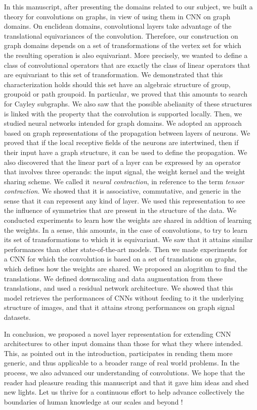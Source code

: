 In this manuscript, after presenting the domains related to our subject, we built a theory for convolutions on graphs, in view of using them in CNN on graph domains. On enclidean domains, convolutional layers take advantage of the translational equivariances of the convolution. Therefore, our construction on graph domains depends on a set of transformations of the vertex set for which the resulting operation is also equivariant. More precisely, we wanted to define a class of convolutional operators that are exactly the class of linear operators that are equivariant to this set of transformation. We demonstrated that this characterization holds should this set have an algebraic structure of group, groupoid or path groupoid. In particular, we proved that this amounts to search for Cayley subgraphs. We also saw that the possible abelianity of these structures is linked with the property that the convolution is supported locally. Then, we studied neural networks intended for graph domains. We adopted an approach based on graph representations of the propagation between layers of neurons. We proved that if the local receptive fields of the neurons are intertwined, then if their input have a graph structure, it can be used to define the propagation. We also discovered that the linear part of a layer can be expressed by an operator that involves three operands: the input signal, the weight kernel and the weight sharing scheme. We called it \emph{neural contraction}, in reference to the term \emph{tensor contraction}. We showed that it is associative, commutative, and generic in the sense that it can represent any kind of layer. We used this representation to see the influence of symmetries that are present in the structure of the data. We conducted experiments to learn how the weights are shared in addtion of learning the weights. In a sense, this amounts, in the case of convolutions, to try to learn its set of transformations to which it is equivariant. We saw that it attains similar performances than other state-of-the-art models. Then we made experiments for a CNN for which the convolution is based on a set of translations on graphs, which defines how the weights are shared. We proposed an alogrithm to find the translations. We defined downscaling and data augmentation from these translations, and used a residual network architecture. We showed that this model retrieves the performances of CNNs without feeding to it the underlying structure of images, and that it attains strong performances on graph signal datasets.

In conclusion, we proposed a novel layer representation for extending CNN architectures to other input domains than those for what they where intended. This, as pointed out in the introduction, participates in rending them more generic, and thus applicable to a broader range of real world problems. In the process, we also advanced our understanding of convolutions. We hope that the reader had pleasure reading this manuscript and that it gave him ideas and shed new lights. Let us thrive for a continuous effort to help advance collectively the boundaries of human knowledge at our scales and beyond !